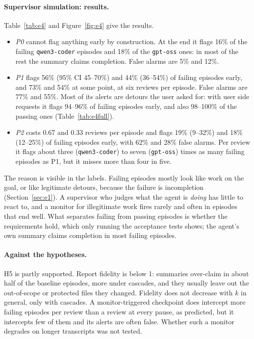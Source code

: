 \paragraph{Supervisor simulation: results.} Table~\ref{tab:e4} and Figure~\ref{fig:e4} give the
results.
\begin{itemize}
  \item \emph{P0} cannot flag anything early by construction. At the end it flags 16\% of the
        failing \texttt{qwen3-coder} episodes and 18\% of the \texttt{gpt-oss} ones: in most of
        the rest the summary claims completion. False alarms are 5\% and 12\%.
  \item \emph{P1} flags 56\% (95\% CI 45--70\%) and 44\% (36--54\%) of failing episodes early, and
        73\% and 54\% at some point, at six reviews per episode. False alarms are 77\% and 55\%.
        Most of its alerts are detours the user asked for: with user side requests it flags
        94--96\% of failing episodes early, and also 98--100\% of the passing ones
        (Table~\ref{tab:e4full}).
  \item \emph{P2} costs 0.67 and 0.33 reviews per episode and flags 19\% (9--32\%) and 18\%
        (12--25\%) of failing episodes early, with 62\% and 28\% false alarms. Per review it flags
        about three (\texttt{qwen3-coder}) to seven (\texttt{gpt-oss}) times as many failing
        episodes as P1, but it misses more than four in five.
\end{itemize}
The reason is visible in the labels. Failing episodes mostly look like work on the goal, or like
legitimate detours, because the failure is incompletion (Section~\ref{sec:e1}). A supervisor who
judges what the agent is \emph{doing} has little to react to, and a monitor for illegitimate work
fires rarely and often in episodes that end well. What separates failing from passing episodes is
whether the requirements hold, which only running the acceptance tests shows; the agent's own
summary claims completion in most failing episodes.

\paragraph{Against the hypotheses.} H5 is partly supported. Report fidelity is below 1: summaries
over-claim in about half of the baseline episodes, more under cascades, and they usually leave out
the out-of-scope or protected files they changed. Fidelity does not decrease with $k$ in general,
only with cascades. A monitor-triggered checkpoint does intercept more failing episodes per review
than a review at every pause, as predicted, but it intercepts few of them and its alerts are often
false. Whether such a monitor degrades on longer transcripts was not tested.
